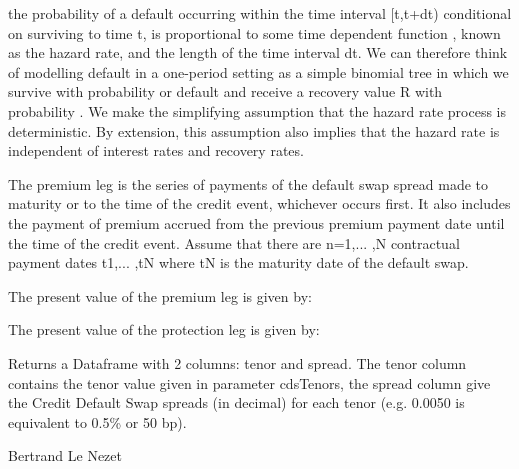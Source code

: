 \documentclass[a4paper]{book}
\begin{document}
\begin{Details}

the probability of a default occurring within the time interval [t,t+dt) conditional on surviving to time t, is proportional to some time dependent function , known as the hazard rate, and the length of the time interval dt. We can therefore think of modelling default in a one-period setting as a simple binomial tree in which we survive with probability  or default and receive a recovery value R with probability . We make the simplifying assumption that the hazard rate process is deterministic. By extension, this assumption also implies that the hazard rate is independent of interest rates
and recovery rates. 


The premium leg is the series of payments of the default swap spread made to maturity or to the time of the credit event, whichever occurs first. It also includes the payment of premium accrued from the previous premium payment date until the time of the credit event. Assume that there are n=1,... ,N contractual payment dates t1,... ,tN where tN is the maturity date of the default swap. 

The present value of the premium leg is given by:






The present value of the protection leg is given by: 


\end{Details}
%
\begin{Value}
Returns a Dataframe with 2 columns: tenor and spread. The tenor column contains the tenor value given in parameter cdsTenors, the spread column give the Credit Default Swap spreads (in decimal) for each tenor (e.g. 0.0050 is equivalent to 0.5\% or 50 bp).
\end{Value}
%
\begin{Author}\relax
Bertrand Le Nezet
\end{Author}
%
\end{document}
